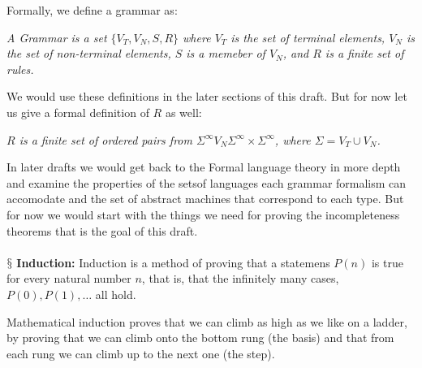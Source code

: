 \documentclass[10pt,a4paper]{article}
\newcounter{theo}
\newcommand{\newpoint}[1]{\indent$\mathsection$ \textbf{#1}}
\begin{document}
                    Formally, we define a grammar as:
                    \begin{define}
                        \textit{A Grammar is a set $\{V_T,V_N,S, R\}$ where $V_T$ is the set of terminal elements, $V_N$ is the set of non-terminal elements, $S$ is a memeber of $V_N$, and $R$ is a finite set of rules.}
                    \end{define}
                    We would use these definitions in the later sections of this draft. But for now let us give a formal definition of $R$ as well:
                    \begin{define}
                        \textit{$R$ is a finite set of ordered pairs from $\Sigma^\infty V_N \Sigma^\infty\times \Sigma^\infty$, where $\Sigma = V_T\cup V_N$.}
                    \end{define}
                    In later drafts we would get back to the Formal language theory in more depth and examine the properties of the setsof languages each grammar formalism can accomodate and the set of abstract machines that correspond to each type. But for now we would start with the things we need for proving the incompleteness theorems that is the goal of this draft.\cite{Leary2019-ip}
                    \\
                    \\
                    \newpoint{Induction:} Induction is a method of proving that a statemens $P(n)$ is true for every natural number $n$, that is, that the infinitely many cases, $P(0), P(1),\dots$ all hold. \cite{enwiki:1157726892}
                    \begin{qt}
                        Mathematical induction proves that we can climb as high as we like on a ladder, by proving that we can climb onto the bottom rung (the basis) and that from each rung we can climb up to the next one (the step).
                    \end{qt}
\end{document}
